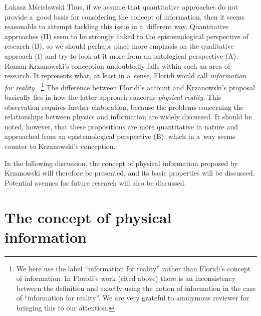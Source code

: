 \begin{artengenv}{Łukasz Mścisławski}
Thus, if we assume that quantitative approaches do not provide a~good basis for considering the concept of information, then it seems reasonable to attempt tackling this issue in a~different way. Quantitative approaches (II) seem to be strongly linked to the epistemological perspective of research (B), so we should perhaps place more emphasis on the qualitative approach (I) and try to look at it more from an ontological perspective (A). Roman Krzanowski's conception undoubtedly falls within such an area of research. It represents what, at least in a~sense, Floridi would call \textit{information for reality}
\parencite[][pp.30–31]{floridi_philosophy_2011}.%
\footnote{We here use the label ``information for reality'' rather than Floridi's concept of information. In Floridi's work (cited above) there is an inconsistency between the definition and exactly using the notion of information in the case of ``information for reality''. We are very grateful to anonymous reviewer for bringing this to our attention.} The difference between Floridi's account and Krzanowski's proposal basically lies in how the latter approach concerns \textit{physical reality}. This observation requires further elaboration, because the problems concerning the relationships between physics and information are widely discussed. It should be noted, however, that these propositions are more quantitative in nature and approached from an epistemological perspective (B), which in a~way seems counter to Krzanowski's conception.

In the following discussion, the concept of physical information proposed by Krzanowski will therefore be presented, and its basic properties will be discussed. Potential avenues for future research will also be discussed.

\section*{The concept of physical information}


\begin{flushright}
\end{flushright}


\end{artengenv}
